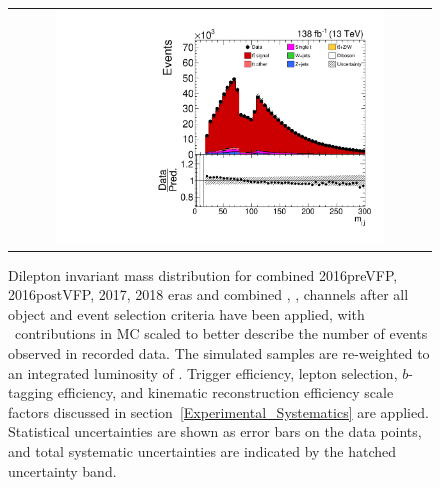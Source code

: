 \begin{figure}[htb]
    \begin{center}
        \begin{tabular}{c}
            \includegraphics[width=0.80\textwidth]{fig_fullRun2UL/controlplots/combined/DIMFull_fullSel.pdf}
        \end{tabular}
        \caption{\footnotesize Dilepton invariant mass distribution for combined 2016preVFP, 2016postVFP, 2017, 2018 eras and combined \ee, \emu, \mumu channels after all object and event selection criteria have been applied, with \zjets\ contributions in MC scaled to better describe the number of events observed in recorded data.
        The simulated samples are re-weighted to an integrated luminosity of \lumivalueRuniiUL.
        Trigger efficiency, lepton selection, $b$-tagging efficiency, and kinematic reconstruction efficiency scale factors discussed in section~\ref{Experimental_Systematics} are applied.
        Statistical uncertainties are shown as error bars on the data points, and total systematic uncertainties are indicated by the hatched uncertainty band.
        }
        \label{Dilepton_Invariant_Mass}
    \end{center}
\end{figure}

\clearpage
